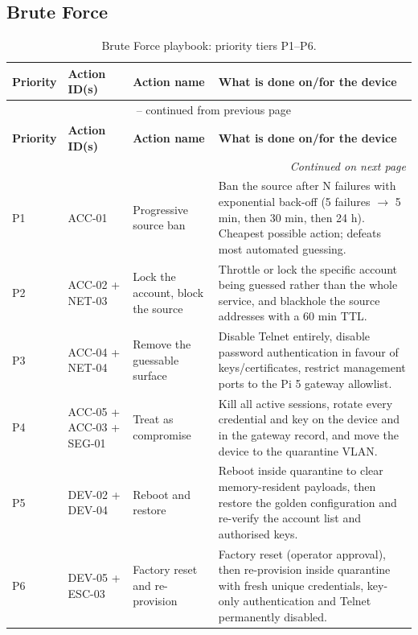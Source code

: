 \subsection{Brute Force}

\begin{longtable}{|p{}|p{}|p{}|p{}|}
\caption{Brute Force playbook: priority tiers P1--P6.}
\label{tab:playbook_bruteforce}\\
\hline
\textbf{Priority} & \textbf{Action ID(s)} & \textbf{Action name} & \textbf{What is done on/for the device} \\
\hline
\endfirsthead
\multicolumn{4}{c}{\tablename\ \thetable{} -- continued from previous page}\\
\hline
\textbf{Priority} & \textbf{Action ID(s)} & \textbf{Action name} & \textbf{What is done on/for the device} \\
\hline
\endhead
\hline \multicolumn{4}{r}{\textit{Continued on next page}}\\
\endfoot
\hline
\endlastfoot
P1 & ACC-01 & Progressive source ban & Ban the source after N failures with exponential back-off (5 failures $\rightarrow$ 5 min, then 30 min, then 24 h). Cheapest possible action; defeats most automated guessing. \\
\hline
P2 & ACC-02 + NET-03 & Lock the account, block the source & Throttle or lock the specific account being guessed rather than the whole service, and blackhole the source addresses with a 60 min TTL. \\
\hline
P3 & ACC-04 + NET-04 & Remove the guessable surface & Disable Telnet entirely, disable password authentication in favour of keys/certificates, restrict management ports to the Pi 5 gateway allowlist. \\
\hline
P4 & ACC-05 + ACC-03 + SEG-01 & Treat as compromise & Kill all active sessions, rotate every credential and key on the device and in the gateway record, and move the device to the quarantine VLAN. \\
\hline
P5 & DEV-02 + DEV-04 & Reboot and restore & Reboot inside quarantine to clear memory-resident payloads, then restore the golden configuration and re-verify the account list and authorised keys. \\
\hline
P6 & DEV-05 + ESC-03 & Factory reset and re-provision & Factory reset (operator approval), then re-provision inside quarantine with fresh unique credentials, key-only authentication and Telnet permanently disabled. \\
\hline
\end{longtable}

